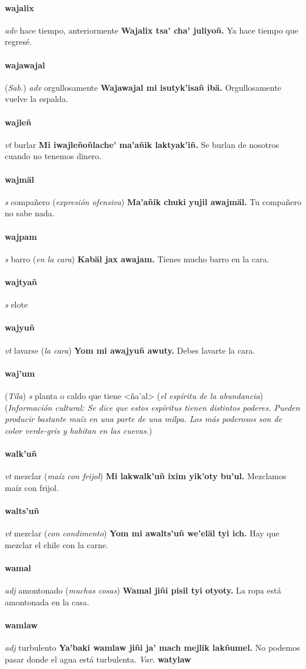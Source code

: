 \documentclass{scrbook}
\newcommand{\entry}[1]{\paragraph{#1}}
\newcommand{\partofspeech}[1]{\textit{#1}}
\newcommand{\spanishtranslation}[1]{#1}
\newcommand{\clarification}[1]{(\textit{#1})}
\newcommand{\cholexample}[1]{\textbf{#1}}
\newcommand{\exampletranslation}[1]{#1}
\newcommand{\relevantdialect}[1]{(\textit{#1})}
\newcommand{\culturalinformation}[1]{(\textit{#1})}
\newcommand{\variation}[1]{\textit{Var.} \textbf{#1}}
\begin{document}
\begin{multicols}{2}
\entry{wajalix}
\partofspeech{adv}
\spanishtranslation{hace tiempo, anteriormente}
\cholexample{Wajalix tsa' cha' juliyoñ.}
\exampletranslation{Ya hace tiempo que regresé.}

\entry{wajawajal}
\relevantdialect{Sab.}
\partofspeech{adv}
\spanishtranslation{orgullosamente}
\cholexample{Wajawajal mi isutyk'isañ ibä.}
\exampletranslation{Orgullosamente vuelve la espalda.}

\entry{wajleñ}
\partofspeech{vt}
\spanishtranslation{burlar}
\cholexample{Mi iwajleñoñlache' ma'añik laktyak'iñ.}
\exampletranslation{Se burlan de nosotros cuando no tenemos dinero.}

\entry{wajmäl}
\partofspeech{s}
\spanishtranslation{compañero}
\clarification{expresión ofensiva}
\cholexample{Ma'añik chuki yujil awajmäl.}
\exampletranslation{Tu compañero no sabe nada.}

\entry{wajpam}
\partofspeech{s}
\spanishtranslation{barro}
\clarification{en la cara}
\cholexample{Kabäl jax awajam.}
\exampletranslation{Tienes mucho barro en la cara.}

\entry{wajtyañ}
\partofspeech{s}
\spanishtranslation{elote}

\entry{wajyuñ}
\partofspeech{vt}
\spanishtranslation{lavarse}
\clarification{la cara}
\cholexample{Yom mi awajyuñ awuty.}
\exampletranslation{Debes lavarte la cara.}

\entry{waj'um}
\relevantdialect{Tila}
\partofspeech{s}
\spanishtranslation{planta o caldo que tiene <ña'al>}
\clarification{el espíritu de la abundancia}
\culturalinformation{Información cultural: Se dice que estos espíritus tienen distintos poderes. Pueden producir bastante maíz en una parte de una milpa. Los más poderosos son de color verde-gris y habitan en las cuevas.}

\entry{walk'uñ}
\partofspeech{vt}
\spanishtranslation{mezclar}
\clarification{maíz con frijol}
\cholexample{Mi lakwalk'uñ ixim yik'oty bu'ul.}
\exampletranslation{Mezclamos maíz con frijol.}

\entry{walts'uñ}
\partofspeech{vt}
\spanishtranslation{mezclar}
\clarification{con condimento}
\cholexample{Yom mi awalts'uñ we'eläl tyi ich.}
\exampletranslation{Hay que mezclar el chile con la carne.}

\entry{wamal}
\partofspeech{adj}
\spanishtranslation{amontonado}
\clarification{muchas cosas}
\cholexample{Wamal jiñi pisil tyi otyoty.}
\exampletranslation{La ropa está amontonada en la casa.}

\entry{wamlaw}
\partofspeech{adj}
\spanishtranslation{turbulento}
\cholexample{Ya'baki wamlaw jiñi ja' mach mejlik lakñumel.}
\exampletranslation{No podemos pasar donde el agua está turbulenta.}
\variation{watylaw}


\end{multicols}
\end{document}

